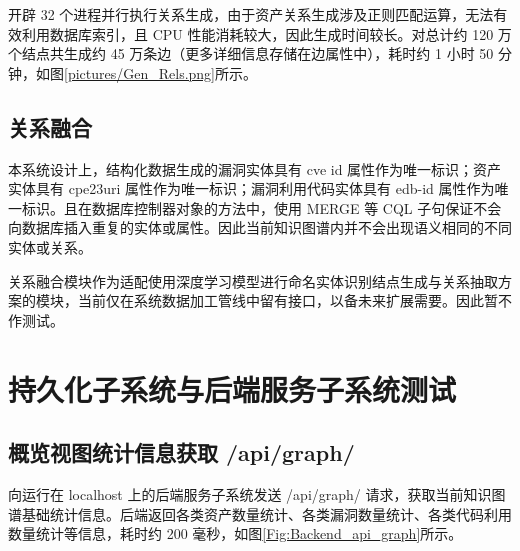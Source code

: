 \documentclass[a4paper,AutoFakeBold,oneside,12pt]{book}
\begin{document}
开辟 32 个进程并行执行关系生成，由于资产关系生成涉及正则匹配运算，无法有效利用数据库索引，且 CPU 性能消耗较大，因此生成时间较长。对总计约 120 万个结点共生成约 45 万条边（更多详细信息存储在边属性中），耗时约 1 小时 50 分钟，如图\ref{pictures/Gen_Rels.png}所示。



\subsection{关系融合}

本系统设计上，结构化数据生成的漏洞实体具有 cve id 属性作为唯一标识；资产实体具有 cpe23uri 属性作为唯一标识；漏洞利用代码实体具有 edb-id 属性作为唯一标识。且在数据库控制器对象的方法中，使用 MERGE 等 CQL 子句保证不会向数据库插入重复的实体或属性。因此当前知识图谱内并不会出现语义相同的不同实体或关系。

关系融合模块作为适配使用深度学习模型进行命名实体识别结点生成与关系抽取方案的模块，当前仅在系统数据加工管线中留有接口，以备未来扩展需要。因此暂不作测试。

\section{持久化子系统与后端服务子系统测试}

\subsection{概览视图统计信息获取 /api/graph/}

向运行在 localhost 上的后端服务子系统发送 /api/graph/ 请求，获取当前知识图谱基础统计信息。后端返回各类资产数量统计、各类漏洞数量统计、各类代码利用数量统计等信息，耗时约 200 毫秒，如图\ref{Fig:Backend_api_graph}所示。
\end{document}
